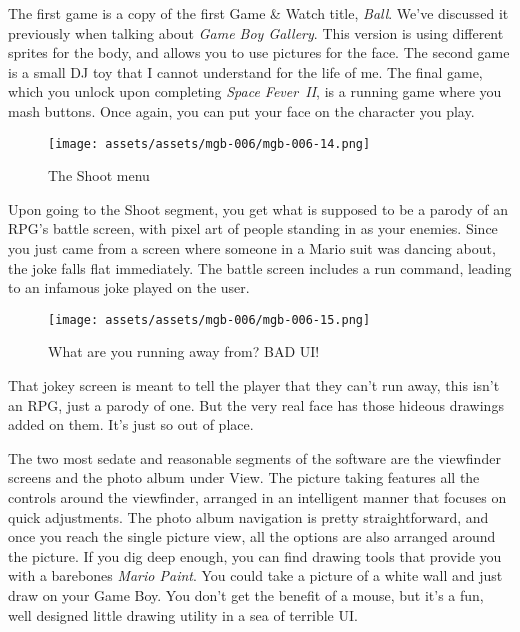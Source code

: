 \documentclass{book}
\let\oldcenter\center
\let\oldendcenter\endcenter
\renewenvironment{center}{\setlength\topsep{0pt}\oldcenter}{\oldendcenter}
\begin{document}
\begin{center}
\vspace{8pt}
\quad\vspace{4pt}
\quad\vspace{4pt}
\end{center}

The first game is a copy of the first Game \& Watch title, \emph{Ball}. We’ve discussed it previously when talking about \emph{Game Boy Gallery}. This version is using different sprites for the body, and allows you to use pictures for the face. The second game is a small DJ toy that I cannot understand for the life of me. The final game, which you unlock upon completing \emph{Space Fever II}, is a running game where you mash buttons. Once again, you can put your face on the character you play.

\begin{figure}[hbt]
\vskip 10pt
\centering \texttt{[image: assets/assets/mgb-006/mgb-006-14.png]}\par\pagetwodescription The Shoot menu
\vskip 6pt
\end{figure}

Upon going to the Shoot segment, you get what is supposed to be a parody of an RPG’s battle screen, with pixel art of people standing in as your enemies. Since you just came from a screen where someone in a Mario suit was dancing about, the joke falls flat immediately. The battle screen includes a run command, leading to an infamous joke played on the user.

\begin{figure}[hbt]
\vskip 10pt
\centering \texttt{[image: assets/assets/mgb-006/mgb-006-15.png]}\par\pagetwodescription What are you running away from? BAD UI!
\vskip 6pt
\end{figure}

That jokey screen is meant to tell the player that they can’t run away, this isn’t an RPG, just a parody of one. But the very real face has those hideous drawings added on them. It’s just so out of place.

The two most sedate and reasonable segments of the software are the viewfinder screens and the photo album under View. The picture taking features all the controls around the viewfinder, arranged in an intelligent manner that focuses on quick adjustments. The photo album navigation is pretty straightforward, and once you reach the single picture view, all the options are also arranged around the picture. If you dig deep enough, you can find drawing tools that provide you with a barebones \emph{Mario Paint}. You could take a picture of a white wall and just draw on your Game Boy. You don’t get the benefit of a mouse, but it’s a fun, well designed little drawing utility in a sea of terrible UI.
\end{document}
